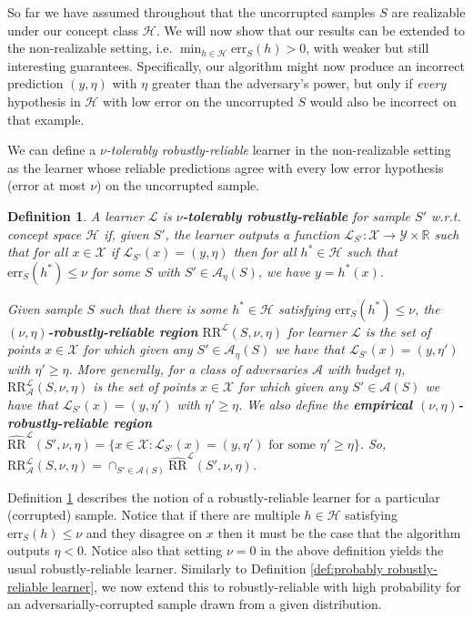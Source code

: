 \documentclass[11pt]{article}
\newcommand{\CR}{\text{RR}}
\newcommand{\ECR}{\widehat{\text{RR}}}
\newcommand{\err}{\mathrm{err}}
\newtheorem{definition}{Definition}
\newcommand{\R}{\mathbb{R}}
\newcommand{\0}{\mathbf{0}}
\newcommand{\1}{\mathbf{1}}
\newcommand{\cA}{\mathcal{A}}
\newcommand{\cH}{\mathcal{H}}
\newcommand{\cL}{\mathcal{L}}
\newcommand{\cY}{\mathcal{Y}}
\newcommand{\cX}{\mathcal{X}}
\begin{document}
{
So far we have assumed throughout that the uncorrupted samples $S$ are realizable under our concept class $\cH$.
We will now show that our results can be extended to the non-realizable setting, i.e. $\min_{h\in\cH}\err_S(h)>0$, with weaker but still interesting guarantees. Specifically, our algorithm might now produce an incorrect prediction $(y,\eta)$ with $\eta$ greater than the adversary's power, but only if {\em every} hypothesis in $\cH$ with low error on the uncorrupted $S$ would also be incorrect on that example.

We can define a {\it $\nu$-tolerably robustly-reliable} learner in the non-realizable setting as the learner whose reliable predictions agree with every low error hypothesis (error at most $\nu$) on the uncorrupted sample.




\begin{definition}A learner $\cL$ is {\bf $\nu$-tolerably robustly-reliable} for sample $S'$ w.r.t. concept space $\cH$ if, given $S'$, the learner outputs a function $\cL_{S'}:\cX\rightarrow\cY\times\R$ such that for all $x\in\cX$ if $\cL_{S'}(x)=(y,\eta)$
then for all $h^*\in\cH$ such that $\err_S(h^*)\le \nu$ for some $S$ with $S'\in \cA_\eta(S)$, we have
$y=h^*(x)$.

Given sample $S$ such that there is some $h^*\in\cH$  satisfying $\err_S(h^*)\le \nu$, the {\bf $(\nu,\eta)$-robustly-reliable region} $\CR^\cL(S,\nu,\eta)$ for learner $\cL$ is the set of points $x\in\cX$ for which given any $S'\in\cA_\eta(S)$ we have that $\cL_{S'}(x)=(y,\eta')$ with $\eta'\ge\eta$. More generally, for a class of adversaries $\cA$ with budget $\eta$, $\CR^\cL_\cA(S,\nu,\eta)$ is the set of points $x\in\cX$ for which given any $S'\in\cA(S)$ we have that $\cL_{S'}(x)=(y,\eta')$ with $\eta'\ge\eta$.
We also define the {\bf empirical $(\nu,\eta)$-robustly-reliable region} $\ECR^\cL(S', \nu,\eta) = \{x \in \cX : \cL_{S'}(x) = (y,\eta') \mbox{ for some }\eta'\geq \eta\}$.  So, $\CR^\cL_\cA(S,\nu,\eta) = \cap_{S'\in\cA(S)} \ECR^\cL(S',\nu, \eta)$.%

\label{def:robustly-reliable learner nonrealizable}
\end{definition}



Definition \ref{def:robustly-reliable learner nonrealizable} describes the notion of a robustly-reliable learner for a particular (corrupted) sample. Notice that if there are multiple $h \in \cH$ satisfying $\err_S(h)\leq \nu$ and they disagree on $x$ then it must be the case that the algorithm outputs $\eta<0$. Notice also that setting $\nu=0$ in the above definition yields the usual robustly-reliable learner. Similarly to Definition \ref{def:probably robustly-reliable learner}, we now extend this to robustly-reliable with high probability for an adversarially-corrupted sample drawn from a given distribution.

}
\end{document}
